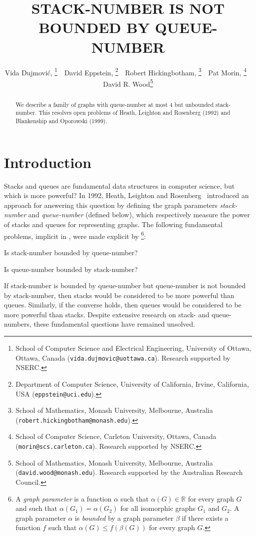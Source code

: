 \documentclass[kpfonts]{patmorin}
\title{\MakeUppercase{Stack-Number is not Bounded by Queue-Number}}
\author{%
	Vida Dujmovi\'c,\!\!%
	\thanks{School of Computer Science and Electrical Engineering,
		University of Ottawa, Ottawa, Canada (\texttt{vida.dujmovic@uottawa.ca}).
		Research supported by NSERC.}
	\,\,
	David Eppstein,\!\!%
	\thanks{Department of Computer Science, University of California, Irvine, California, USA (\texttt{eppstein@uci.edu}).}
	\,\,
	Robert Hickingbotham,\!\!%
	\thanks{School of Mathematics, Monash University, Melbourne, Australia (\texttt{robert.hickingbotham@monash.edu}).}
	\,\,
	Pat Morin,\!\!%
	\thanks{School of Computer Science, Carleton University, Ottawa, Canada (\texttt{morin@scs.carleton.ca}). Research  supported by NSERC.}
	\,\,
	David R. Wood\thanks{School of Mathematics, Monash University, Melbourne, Australia (\texttt{david.wood@monash.edu}). Research supported by the Australian Research Council.}
}
\renewcommand{\leq}{\leqslant}
\begin{document}
\maketitle

\begin{abstract}
We describe a family of graphs with queue-number at most 4 but unbounded stack-number. This resolves open problems of Heath, Leighton and Rosenberg (1992) and Blankenship and Oporowski (1999).
\end{abstract}

\bigskip

\section{Introduction}

Stacks and queues are fundamental data structures in computer science, but which is more powerful? In 1992, Heath, Leighton and Rosenberg~\cite{HLR92,HR92} introduced an approach for answering this question by defining the graph parameters \textit{stack-number} and \textit{queue-number} (defined below), which respectively measure the power of stacks and queues for representing graphs. The following fundamental problems, implicit in \citep{HLR92,HR92}, were made explicit by \citet{DujWoo05}\footnote{A \emph{graph parameter} is a function $\alpha$ such that $\alpha(G)\in\mathbb{R}$ for every graph $G$ and such that $\alpha(G_1)=\alpha(G_2)$ for all isomorphic graphs $G_1$ and $G_2$. A graph parameter $\alpha$ is \textit{bounded} by a graph parameter $\beta$ if there exists a function $f$ such that $\alpha(G) \leq f(\beta(G))$ for every graph $G$.}:
\begin{compactitem}
	\item Is stack-number bounded by queue-number?
	\item Is queue-number bounded by stack-number?
\end{compactitem}

If stack-number is bounded by queue-number but queue-number is not bounded by stack-number, then stacks would be considered to be more powerful than queues. Similarly, if the converse holds, then queues would be considered to be more powerful than stacks. Despite extensive research on stack- and queue-numbers, these fundamental questions have remained unsolved.

\end{document}
